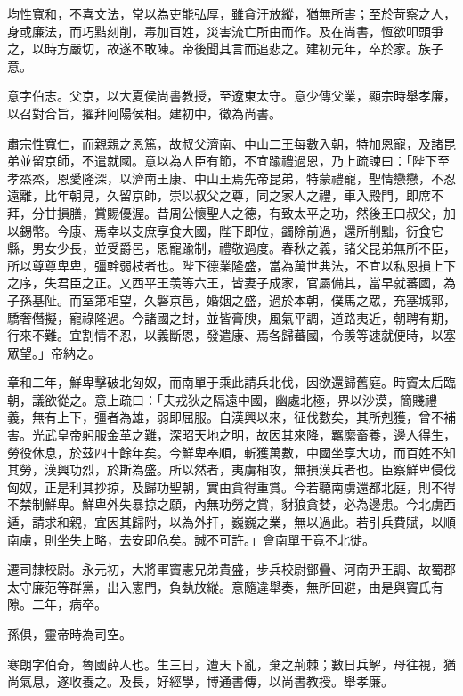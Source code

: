 \begin{pinyinscope}
均性寬和，不喜文法，常以為吏能弘厚，雖貪汙放縱，猶無所害；至於苛察之人，身或廉法，而巧黠刻削，毒加百姓，災害流亡所由而作。及在尚書，恆欲叩頭爭之，以時方嚴切，故遂不敢陳。帝後聞其言而追悲之。建初元年，卒於家。族子意。

意字伯志。父京，以大夏侯尚書教授，至遼東太守。意少傳父業，顯宗時舉孝廉，以召對合旨，擢拜阿陽侯相。建初中，徵為尚書。

肅宗性寬仁，而親親之恩篤，故叔父濟南、中山二王每數入朝，特加恩寵，及諸昆弟並留京師，不遣就國。意以為人臣有節，不宜踰禮過恩，乃上疏諫曰：「陛下至孝烝烝，恩愛隆深，以濟南王康、中山王焉先帝昆弟，特蒙禮寵，聖情戀戀，不忍遠離，比年朝見，久留京師，崇以叔父之尊，同之家人之禮，車入殿門，即席不拜，分甘損膳，賞賜優渥。昔周公懷聖人之德，有致太平之功，然後王曰叔父，加以錫幣。今康、焉幸以支庶享食大國，陛下即位，蠲除前過，還所削黜，衍食它縣，男女少長，並受爵邑，恩寵踰制，禮敬過度。春秋之義，諸父昆弟無所不臣，所以尊尊卑卑，彊幹弱枝者也。陛下德業隆盛，當為萬世典法，不宜以私恩損上下之序，失君臣之正。又西平王羡等六王，皆妻子成家，官屬備其，當早就蕃國，為子孫基阯。而室第相望，久磐京邑，婚姻之盛，過於本朝，僕馬之眾，充塞城郭，驕奢僭擬，寵祿隆過。今諸國之封，並皆膏腴，風氣平調，道路夷近，朝聘有期，行來不難。宜割情不忍，以義斷恩，發遣康、焉各歸蕃國，令羡等速就便時，以塞眾望。」帝納之。

章和二年，鮮卑擊破北匈奴，而南單于乘此請兵北伐，因欲還歸舊庭。時竇太后臨朝，議欲從之。意上疏曰：「夫戎狄之隔遠中國，幽處北極，界以沙漠，簡賤禮義，無有上下，彊者為雄，弱即屈服。自漢興以來，征伐數矣，其所剋獲，曾不補害。光武皇帝躬服金革之難，深昭天地之明，故因其來降，羈縻畜養，邊人得生，勞役休息，於茲四十餘年矣。今鮮卑奉順，斬獲萬數，中國坐享大功，而百姓不知其勞，漢興功烈，於斯為盛。所以然者，夷虜相攻，無損漢兵者也。臣察鮮卑侵伐匈奴，正是利其抄掠，及歸功聖朝，實由貪得重賞。今若聽南虜還都北庭，則不得不禁制鮮卑。鮮卑外失暴掠之願，內無功勞之賞，豺狼貪婪，必為邊患。今北虜西遁，請求和親，宜因其歸附，以為外扞，巍巍之業，無以過此。若引兵費賦，以順南虜，則坐失上略，去安即危矣。誠不可許。」會南單于竟不北徙。

遷司隸校尉。永元初，大將軍竇憲兄弟貴盛，步兵校尉鄧疊、河南尹王調、故蜀郡太守廉范等群黨，出入憲門，負埶放縱。意隨違舉奏，無所回避，由是與竇氏有隙。二年，病卒。

孫俱，靈帝時為司空。

寒朗字伯奇，魯國薛人也。生三日，遭天下亂，棄之荊棘；數日兵解，母往視，猶尚氣息，遂收養之。及長，好經學，博通書傳，以尚書教授。舉孝廉。


\end{pinyinscope}
